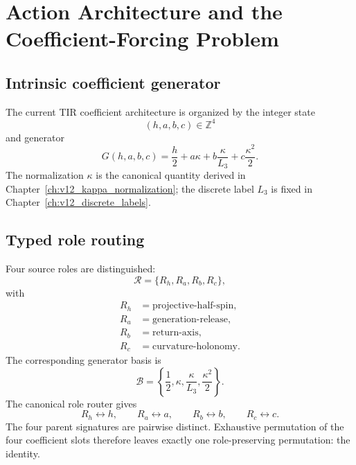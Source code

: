 \chapter[Action Architecture and Coefficient Forcing]{Action Architecture and the Coefficient-Forcing Problem}
\label{ch:v12_action_coefficients}

\section{Intrinsic coefficient generator}
The current TIR coefficient architecture is organized by the integer state
\begin{equation}
\boxed{(h,a,b,c)\in\mathbb Z^4}
\label{eq:v12-coefficient-state}
\end{equation}
and generator
\begin{equation}
\boxed{
G(h,a,b,c)
=\frac h2
+a\kappa
+b\frac{\kappa}{L_3}
+c\frac{\kappa^2}{2}.
}
\label{eq:v12-coefficient-generator}
\end{equation}
The normalization $\kappa$ is the canonical quantity derived in
Chapter~\ref{ch:v12_kappa_normalization}; the discrete label $L_3$ is fixed in
Chapter~\ref{ch:v12_discrete_labels}.

\section{Typed role routing}
Four source roles are distinguished:
\[
\mathcal R
=\{R_h,R_a,R_b,R_c\},
\]
with
\begin{align}
R_h&=\text{projective-half-spin},\\
R_a&=\text{generation-release},\\
R_b&=\text{return-axis},\\
R_c&=\text{curvature-holonomy}.
\end{align}
The corresponding generator basis is
\begin{equation}
\mathcal B
=\left\{
\frac12,
\kappa,
\frac{\kappa}{L_3},
\frac{\kappa^2}{2}
\right\}.
\label{eq:v12-generator-basis}
\end{equation}
The canonical role router gives
\begin{equation}
\boxed{
R_h\leftrightarrow h,
\qquad
R_a\leftrightarrow a,
\qquad
R_b\leftrightarrow b,
\qquad
R_c\leftrightarrow c.
}
\label{eq:v12-role-slot-map}
\end{equation}
The four parent signatures are pairwise distinct. Exhaustive permutation of the
four coefficient slots therefore leaves exactly one role-preserving
permutation: the identity.

